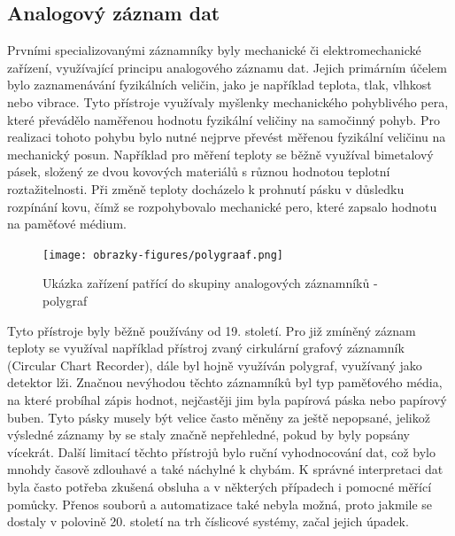   
\subsection{Analogový záznam dat} %
\label{moznosti_zaznamu_dat}
Prvními specializovanými záznamníky byly mechanické či elektromechanické zařízení, využívající principu analogového záznamu dat. Jejich primárním účelem bylo zaznamenávání fyzikálních veličin, 
jako je například teplota, tlak, vlhkost nebo vibrace. Tyto přístroje využívaly myšlenky mechanického pohyblivého pera, které převádělo naměřenou hodnotu fyzikální veličiny na samočinný pohyb. 
Pro realizaci tohoto pohybu bylo nutné nejprve převést měřenou fyzikální veličinu na mechanický posun. Například pro měření teploty se běžně využíval bimetalový pásek, složený ze dvou kovových 
materiálů s různou hodnotou teplotní roztažitelnosti. Při změně teploty docházelo k prohnutí pásku v důsledku rozpínání kovu, čímž se rozpohybovalo mechanické pero, které zapsalo hodnotu na 
paměťové médium. 


\begin{figure}[h] %
    \centering
    \texttt{[image: obrazky-figures/polygraaf.png]}
    \caption{Ukázka zařízení patřící do skupiny analogových záznamníků - polygraf \cite{polygraph_picture}}
    \label{fig:polygraaf}
\end{figure}


Tyto přístroje byly běžně používány od 19. století. Pro již zmíněný záznam teploty se využíval například přístroj zvaný cirkulární grafový záznamník (Circular Chart Recorder), dále byl hojně 
využíván polygraf, využívaný jako detektor lži. Značnou nevýhodou těchto záznamníků byl typ paměťového média, na které probíhal zápis hodnot, nejčastěji jim byla papírová páska nebo papírový 
buben. Tyto pásky musely být velice často měněny za ještě nepopsané, jelikož výsledné záznamy by se staly značně nepřehledné, pokud by byly popsány vícekrát.
Další limitací těchto přístrojů bylo ruční vyhodnocování dat, což bylo mnohdy časově zdlouhavé a také náchylné k chybám. K správné interpretaci dat byla často potřeba zkušená obsluha a v 
některých případech i pomocné měřící pomůcky. Přenos souborů a automatizace také nebyla možná, proto jakmile se dostaly v polovině 20. století na trh číslicové systémy, začal 
jejich úpadek. \cite{newcastle_history_of_digital_computers, florian_prechod_a_analog_do_digital}

